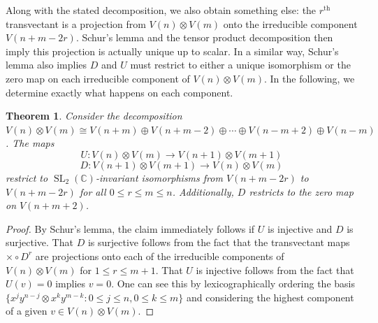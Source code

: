 \documentclass{article}
\newtheorem{theorem}{Theorem}[section]
\theoremstyle{definition}
\theoremstyle{plain}
\newcommand{\C}{\mathbb{C}}
\DeclareMathOperator{\SL}{SL}
\begin{document}
Along with the stated decomposition, we also obtain something else: the $r^\text{th}$ transvectant is a projection from $V(n) \otimes V(m)$ onto the irreducible component $V(n+m-2r)$. Schur's lemma and the tensor product decomposition then imply this projection is actually unique up to scalar. In a similar way, Schur's lemma also implies $D$ and $U$ must restrict to either a unique isomorphism or the zero map on each irreducible component of $V(n) \otimes V(m)$. In the following, we determine exactly what happens on each component.

\begin{theorem}\label{Umaps_thm}
    Consider the decomposition $V(n) \otimes V(m) \cong V(n+m) \oplus V(n+m-2) \oplus \cdots \oplus V(n-m+2) \oplus V(n-m)$. The maps
    \[
        U: V(n) \otimes V(m) \rightarrow V(n+1) \otimes V(m+1)
    \]
    \[
        D: V(n+1) \otimes V(m+1) \rightarrow V(n) \otimes V(m)
    \]
    restrict to $\SL_2(\C)$-invariant isomorphisms from $V(n+m-2r)$ to $V(n+m-2r)$ for all $0 \leq r \leq m \leq n$. Additionally, $D$ restricts to the zero map on $V(n+m+2)$.
\end{theorem}
\begin{proof}
    By Schur's lemma, the claim immediately follows if $U$ is injective and $D$ is surjective. That $D$ is surjective follows from the fact that the transvectant maps $\times \circ D^r$ are projections onto each of the irreducible components of $V(n) \otimes V(m)$ for $1 \leq r \leq m+1$. That $U$ is injective follows from the fact that $U(v) = 0$ implies $v=0$. One can see this by lexicographically ordering the basis $\{x^jy^{n-j} \otimes x^ky^{m-k} : 0 \leq j \leq n, 0 \leq k \leq m\}$ and considering the highest component of a given $v \in V(n) \otimes V(m)$.
\end{proof}
\end{document}
